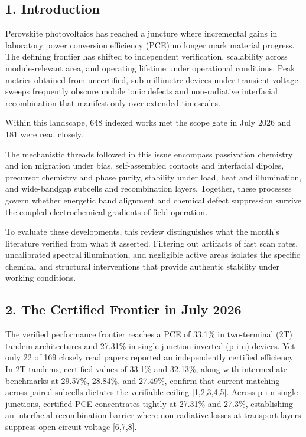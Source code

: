 \documentclass[
  11pt,
]{article}
\begin{document}
\subsection{1. Introduction}\label{introduction}

Perovskite photovoltaics has reached a juncture where incremental gains
in laboratory power conversion efficiency (PCE) no longer mark material
progress. The defining frontier has shifted to independent verification,
scalability across module-relevant area, and operating lifetime under
operational conditions. Peak metrics obtained from uncertified,
sub-millimetre devices under transient voltage sweeps frequently obscure
mobile ionic defects and non-radiative interfacial recombination that
manifest only over extended timescales.

Within this landscape, 648 indexed works met the scope gate in July 2026
and 181 were read closely.

The mechanistic threads followed in this issue encompass passivation
chemistry and ion migration under bias, self-assembled contacts and
interfacial dipoles, precursor chemistry and phase purity, stability
under load, heat and illumination, and wide-bandgap subcells and
recombination layers. Together, these processes govern whether energetic
band alignment and chemical defect suppression survive the coupled
electrochemical gradients of field operation.

To evaluate these developments, this review distinguishes what the
month's literature verified from what it asserted. Filtering out
artifacts of fast scan rates, uncalibrated spectral illumination, and
negligible active areas isolates the specific chemical and structural
interventions that provide authentic stability under working conditions.

\subsection{2. The Certified Frontier in July
2026}\label{the-certified-frontier-in-july-2026}

The verified performance frontier reaches a PCE of 33.1\% in
two-terminal (2T) tandem architectures and 27.31\% in single-junction
inverted (p-i-n) devices. Yet only 22 of 169 closely read papers
reported an independently certified efficiency. In 2T tandems, certified
values of 33.1\% and 32.13\%, along with intermediate benchmarks at
29.57\%, 28.84\%, and 27.49\%, confirm that current matching across
paired subcells dictates the verifiable ceiling
{[}\href{https://doi.org/10.1126/sciadv.aei2945}{1},\href{https://doi.org/10.1002/anie.1676645}{2},\href{https://doi.org/10.1002/adma.74078}{3},\href{https://doi.org/10.1126/sciadv.aeb8790}{4},\href{https://doi.org/10.1126/sciadv.aef6600}{5}{]}.
Across p-i-n single junctions, certified PCE concentrates tightly at
27.31\% and 27.3\%, establishing an interfacial recombination barrier
where non-radiative losses at transport layers suppress open-circuit
voltage
{[}\href{https://doi.org/10.1002/adma.73807}{6},\href{https://doi.org/10.1126/sciadv.aeg1456}{7},\href{https://doi.org/10.1126/science.aed8175}{8}{]}.
\end{document}
